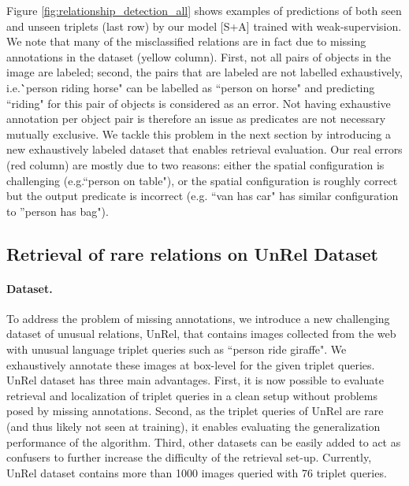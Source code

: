 \documentclass[10pt,twocolumn,letterpaper]{article}
\newcommand{\spaceparagraph}{\vspace{-.35cm}}
\newcommand{\gotoline}{\vspace{.05cm}}
\begin{document}
\gotoline
Figure \ref{fig:relationship_detection_all} shows examples of predictions  of both seen and unseen triplets (last row) by our model [S+A] trained with weak-supervision. We note that many of the misclassified relations are in fact due to missing annotations in the dataset (yellow column). First, not all pairs of objects in the image are labeled; second, the pairs that are labeled are not labelled exhaustively, i.e.\``person riding horse" can be labelled as ``person on horse" and predicting ``riding" for this pair of objects is considered as an error. Not having exhaustive annotation per object pair is therefore an issue as predicates are not necessary mutually exclusive. We tackle this problem in the next section by introducing a new exhaustively labeled dataset that enables retrieval evaluation. Our real errors (red column) are mostly due to two reasons: either the spatial configuration is challenging (e.g.``person on table"), or the spatial configuration is roughly correct  but the output predicate is incorrect (e.g. ``van has car" has similar configuration to ''person has bag"). 


\subsection{Retrieval of rare relations on UnRel Dataset}


\paragraph{Dataset.} To address the problem of missing annotations, we introduce a new challenging dataset of unusual relations, UnRel, that contains images collected from the web with unusual language triplet queries such as ``person ride giraffe". We exhaustively annotate these images at box-level for the given triplet queries. 
UnRel dataset has three main advantages. First, it is now possible to evaluate retrieval and localization of triplet queries in a clean setup without problems posed by missing annotations. Second, as the triplet queries of UnRel are rare (and thus likely not seen at training), it enables evaluating the generalization performance of the algorithm. Third, other datasets can be easily added to act as confusers to further increase the difficulty of the retrieval set-up. 
Currently, UnRel dataset contains more than 1000 images queried with 76 triplet queries.

\spaceparagraph
\end{document}
